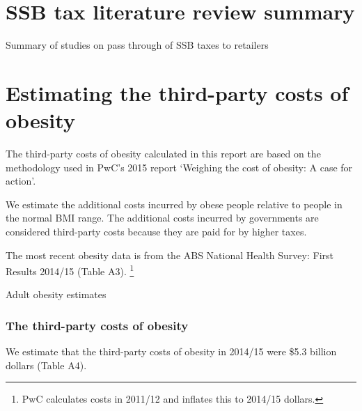 \documentclass[embargoed]{grattan}
\begin{document}
\appendix

\onecolumn
\chapter{SSB tax literature review summary}\label{appendix-1-ssb-tax-literature-review-summary}




\begin{table}[t]
\caption{Summary of studies on pass through of SSB taxes to retailers}



\end{table}
\twocolumn

\chapter{Estimating the third-party costs of obesity }\label{appendix-2-estimating-the-third-party-costs-of-obesity}

The third-party costs of obesity calculated in this report are based on the methodology used in PwC's 2015 report `Weighing the cost of obesity: A case for action'.

We estimate the additional costs incurred by obese people relative to people in the normal BMI range.
The additional costs incurred by governments are considered third-party costs because they are paid for by higher taxes.

The most recent obesity data is from the ABS National Health Survey: First Results 2014/15 (Table A3).%
\footnote{PwC calculates costs in 2011/12 and inflates this to 2014/15 dollars.}

\begin{table}
\caption{Adult obesity estimates}



\end{table}

\subsection{The third-party costs of obesity}\label{the-third-party-costs-of-obesity}

We estimate that the third-party costs of obesity in 2014/15 were \$5.3 billion dollars (Table A4).
\end{document}
